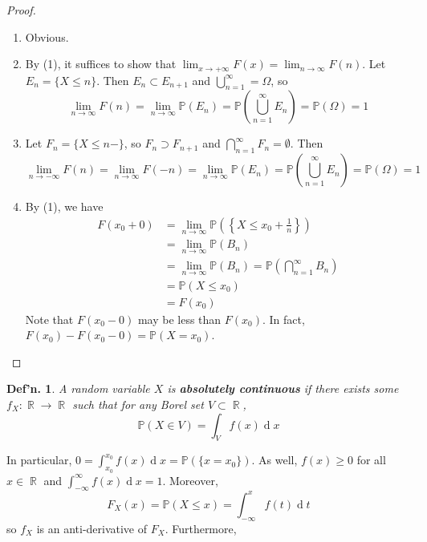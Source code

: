 \documentclass[12pt, a4paper]{book}
\DeclareMathOperator{\R}{\mathbb{R}}
\renewcommand{\Pr}{\mathbb{P}}
\renewcommand{\d}[1]{\ensuremath{\operatorname{d}\!{#1}}} %
\newtheorem{definition}[theorem]{Def'n.}
\theoremstyle{nonumberplain}
\newtheorem{proof}{Proof}
\begin{document}
\begin{proof}
    \begin{enumerate}
        \item Obvious.
        \item By (1), it suffices to show that $\lim_{x\to+\infty}F(x)=\lim_{n\to\infty}F(n)$.
            Let $E_n=\{X\leq n\}$.
            Then $E_n\subset E_{n+1}$ and $\bigcup\limits_{n=1}^\infty=\Omega$, so
            \begin{equation*}
                \lim_{n\to\infty}F(n)=\lim_{n\to\infty}\Pr(E_n)=\Pr\left(\bigcup\limits_{n=1}^\infty E_n\right)=\Pr(\Omega)=1
            \end{equation*}
        \item Let $F_n=\{X\leq n-\}$, so $F_n\supset F_{n+1}$ and $\bigcap\limits_{n=1}^\infty F_n=\emptyset$.
            Then
            \begin{equation*}
                \lim_{n\to-\infty}F(n)=\lim_{n\to\infty}F(-n)=\lim_{n\to\infty}\Pr(E_n)=\Pr\left(\bigcup\limits_{n=1}^\infty E_n\right)=\Pr(\Omega)=1
            \end{equation*}
        \item By (1), we have
            \begin{align*}
                F(x_0+0) &= \lim_{n\to\infty}\Pr\left(\left\{X\leq x_0+\frac{1}{n}\right\}\right)\\
                    &=\lim_{n\to\infty}\Pr(B_n)\\
                    &= \lim_{n\to\infty}\Pr(B_n)=\Pr\left(\bigcap\limits_{n=1}^\infty B_n\right)\\
                    &= \Pr(X\leq x_0)\\
                    &= F(x_0)
            \end{align*}
            Note that $F(x_0-0)$ may be less than $F(x_0)$.
            In fact, $F(x_0)-F(x_0-0)=\Pr(X=x_0)$.
    \end{enumerate}
\end{proof}
\begin{definition}
    A random variable $X$ is \textbf{absolutely continuous} if there exists some $f_X:\R\to\R$ such that for any Borel set $V\subset\R$,
    \[\Pr(X\in V)=\int_V f(x)\d{x}\]
\end{definition}
In particular, $0=\int_{x_0}^{x_0}f(x)\d{x}=\Pr(\{x=x_0\})$.
As well, $f(x)\geq 0$ for all $x\in\R$ and $\int_{-\infty}^\infty f(x)\d{x}=1$.
Moreover,
\[F_X(x)=\Pr(X\leq x)=\int_{-\infty}^x f(t)\d{t}\]
so $f_X$ is an anti-derivative of $F_X$.
Furthermore,
\end{document}
